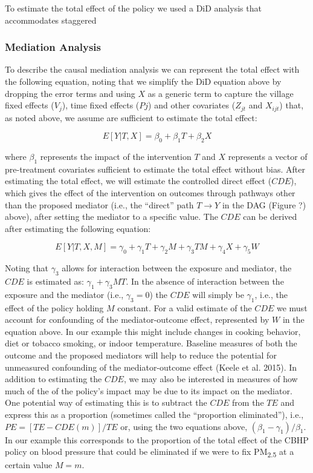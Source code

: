 \documentclass[
  letterpaper,
  DIV=11,
  numbers=noendperiod]{scrartcl}
\begin{document}
To estimate the total effect of the policy we used a DiD analysis that
accommodates staggered

\hypertarget{mediation-analysis}{%
\subsubsection{Mediation Analysis}\label{mediation-analysis}}

To describe the causal mediation analysis we can represent the total
effect with the following equation, noting that we simplify the DiD
equation above by dropping the error terms and using \(X\) as a generic
term to capture the village fixed effects (\(V_{j}\)), time fixed
effects (\(P{j}\)) and other covariates (\(Z_{jt}\) and \(X_{ijt}\))
that, as noted above, we assume are sufficient to estimate the total
effect:

\[E[Y|T,X]=\beta_{0}+\beta_{1}T +\beta_{2}X\]

where \(\beta_{1}\) represents the impact of the intervention \(T\) and
\(X\) represents a vector of pre-treatment covariates sufficient to
estimate the total effect without bias. After estimating the total
effect, we will estimate the controlled direct effect (\(CDE\)), which
gives the effect of the intervention on outcomes through pathways other
than the proposed mediator (i.e., the ``direct'' path \(T\rightarrow Y\)
in the DAG (Figure ?) above), after setting the mediator to a specific
value. The \(CDE\) can be derived after estimating the following
equation:

\[E[Y|T,X,M] = \gamma_{0} + \gamma_{1}T + \gamma_{2}M + \gamma_{3}TM + \gamma_{4}X + \gamma_{5}W\]

Noting that \(\gamma_{3}\) allows for interaction between the exposure
and mediator, the \(CDE\) is estimated as: \(\gamma_{1}+\gamma_{3}MT\).
In the absence of interaction between the exposure and the mediator
(i.e., \(\gamma_{3}=0\)) the \(CDE\) will simply be \(\gamma_{1}\),
i.e., the effect of the policy holding \(M\) constant. For a valid
estimate of the \(CDE\) we must account for confounding of the
mediator-outcome effect, represented by \(W\) in the equation above. In
our example this might include changes in cooking behavior, diet or
tobacco smoking, or indoor temperature. Baseline measures of both the
outcome and the proposed mediators will help to reduce the potential for
unmeasured confounding of the mediator-outcome effect (Keele et al.
2015). In addition to estimating the \(CDE\), we may also be interested
in measures of how much of the of the policy's impact may be due to its
impact on the mediator. One potential way of estimating this is to
subtract the \(CDE\) from the \(TE\) and express this as a proportion
(sometimes called the ``proportion eliminated''), i.e.,
\(PE = [TE - CDE(m)] / TE\) or, using the two equations above,
\((\beta_{1} - \gamma_{1}) / \beta_{1}\). In our example this
corresponds to the proportion of the total effect of the CBHP policy on
blood pressure that could be eliminated if we were to fix
PM\textsubscript{2.5} at a certain value \(M=m\).
\end{document}
